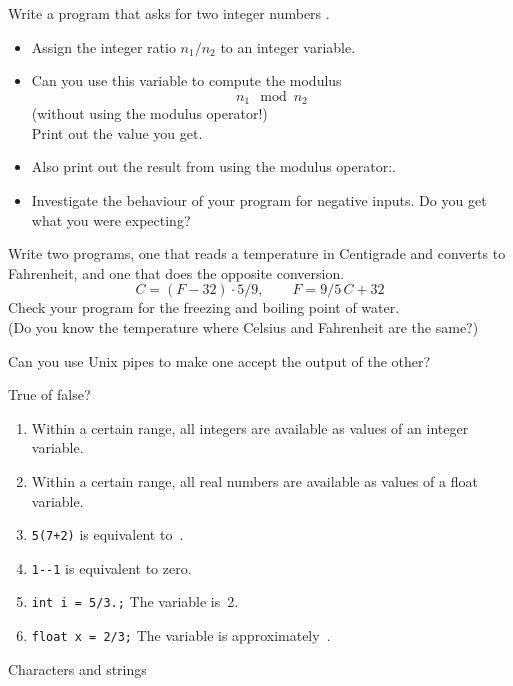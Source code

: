 \begin{exercise}
  \label{ex:modulus}
  Write a program that asks for two integer numbers .
  \begin{itemize}
  \item Assign the integer ratio $n_1/n_2$ to an integer variable.
  \item Can you use this variable to compute the modulus
    \[ n_1\mod n_2 \]
    (without using the  modulus operator!)\\
    Print out the value you get.
  \item Also print out the result from using the modulus
    operator:.
  \item Investigate the behaviour of your program for negative
    inputs. Do you get what you were expecting?
  \end{itemize}
\end{exercise}

\begin{exercise}
  \label{ex:C2F}
  Write two programs, one that reads a temperature in Centigrade and
  converts to Fahrenheit, and one that does the opposite conversion.
  \[ C = (F-32)\cdot 5/9,\qquad F = 9/5\,C+32 \]
  Check your program for the freezing and boiling point of water.\\
  (Do you know the temperature where Celsius and Fahrenheit are the
  same?)
  
  Can you use Unix pipes to make one accept the output of the other?
\end{exercise}

\begin{review}
  \label{q:vartypes}
  True of false?
  \begin{enumerate}
  \item Within a certain range, all integers are available as values of an
    integer variable.
  \item Within a certain range, all real numbers are available as values of a
    float variable.
  \item \verb-5(7+2)- is equivalent to~.
  \item \verb+1--1+ is equivalent to zero.
  \item \verb-int i = 5/3.;- The variable  is~2.
  \item \verb-float x = 2/3;- The variable  is approximately~.
  \end{enumerate}
\end{review}

 {Characters and strings}


